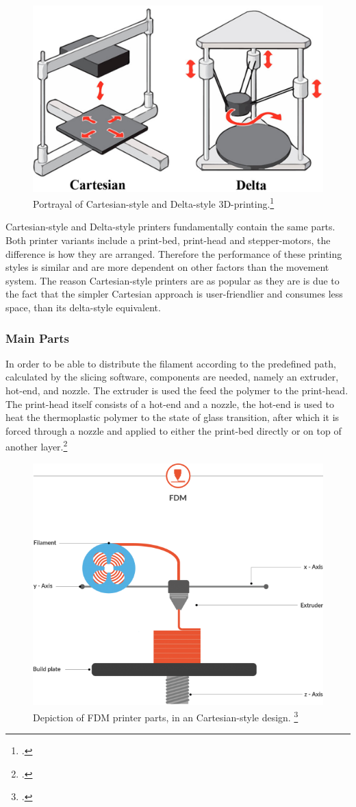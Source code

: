 \begin{figure}[h]
	\centering
	\includegraphics[width=0.6\linewidth]{img/cartesianDeltaPrinting}
	\caption{Portrayal of Cartesian-style and Delta-style 3D-printing.\footcite{Schmitt2017}}
	\label{fig:custom_parts_printerMovement}
\end{figure}

Cartesian-style and Delta-style printers fundamentally contain the same parts. Both printer variants include a print-bed, print-head and stepper-motors, the difference is how they are arranged. Therefore the performance of these printing styles is similar and are more dependent on other factors than the movement system. The reason Cartesian-style printers are as popular as they are is due to the fact that the simpler Cartesian approach is user-friendlier and consumes less space, than its delta-style equivalent.\newline

\subsubsection{Main Parts}

In order to be able to distribute the filament according to the predefined path, calculated by the slicing software, components are needed, namely an extruder, hot-end, and nozzle. The extruder is used the feed the polymer to the print-head. The print-head itself consists of a hot-end and a nozzle, the hot-end is used to heat the thermoplastic polymer to the state of glass transition, after which it is forced through a nozzle and applied to either the print-bed directly or on top of another layer.\footcite{all3dpFDM3DPrinting2020}


\begin{figure}[h]
	\centering
	\includegraphics[width=0.5\linewidth]{img/FDM_Principle}
	\caption{Depiction of FDM printer parts, in an Cartesian-style design. \footcite{druckwegeFusedDepositionModelling}}
	\label{fig:custom_parts_fdm_parts}
\end{figure}

